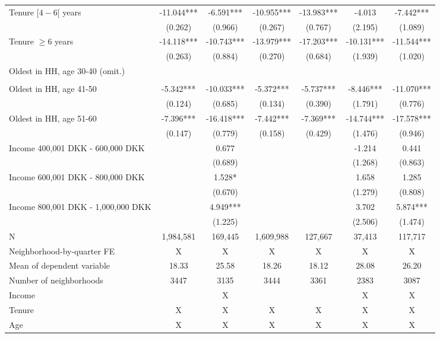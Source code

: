\begin{tabular}{lcccccc}
Tenure $[4-6[$ years & -11.044*** & -6.591*** & -10.955*** & -13.983*** & -4.013 & -7.442*** \\ 
 & (0.262) & (0.966) & (0.267) & (0.767) & (2.195) & (1.089) \\ 
Tenure $\geq 6$ years & -14.118*** & -10.743*** & -13.979*** & -17.203*** & -10.131*** & -11.544*** \\ 
 & (0.263) & (0.884) & (0.270) & (0.684) & (1.939) & (1.020) \\ 
 Oldest in HH, age 30-40 (omit.) &  &  &  &  &  &  \\ 
 &  &  &  &  &  & \\ 
Oldest in HH, age 41-50 & -5.342*** & -10.033*** & -5.372*** & -5.737*** & -8.446*** & -11.070*** \\ 
 & (0.124) & (0.685) & (0.134) & (0.390) & (1.791) & (0.776) \\ 
Oldest in HH, age 51-60 & -7.396*** & -16.418*** & -7.442*** & -7.369*** & -14.744*** & -17.578*** \\ 
 & (0.147) & (0.779) & (0.158) & (0.429) & (1.476) & (0.946) \\ 
Income 400,001 DKK - 600,000 DKK &  & 0.677 &  &  & -1.214 & 0.441 \\ 
 &  & (0.689) &  &  & (1.268) & (0.863) \\ 
Income 600,001 DKK - 800,000 DKK &  & 1.528* &  &  & 1.658 & 1.285 \\ 
 &  & (0.670) &  &  & (1.279) & (0.808) \\ 
Income 800,001 DKK - 1,000,000 DKK &  & 4.949*** &  &  & 3.702 & 5.874*** \\ 
\midrule
 &  & (1.225) &  &  & (2.506) & (1.474) \\ 
N & 1,984,581 & 169,445 & 1,609,988 & 127,667 & 37,413 & 117,717 \\ 
Neighborhood-by-quarter FE & X & X & X & X & X & X \\ 
Mean of dependent variable & 18.33 & 25.58 & 18.26 & 18.12 & 28.08 & 26.20 \\ 
Number of neighborhoods & 3447 & 3135 & 3444 & 3361 & 2383 & 3087 \\ 
Income &  & X &  &  & X & X \\ 
Tenure & X & X & X & X & X & X \\ 
Age & X & X & X & X & X & X \\ 
\bottomrule
\end{tabular}